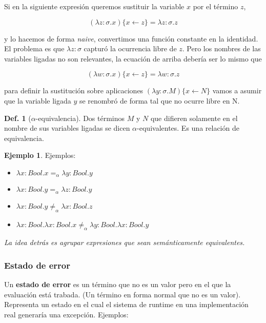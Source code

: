 \documentclass{report}
\theoremstyle{definition} %
\newtheorem{definition}{Def.}[chapter]
\newtheorem*{example*}{Ejemplo}
\newcommand{\aeq}{=_\alpha}
\newcommand{\naeq}{\neq_\alpha}
\newcommand{\abs}[3]{\lambda #1 : #2 . #3}
\newcommand{\sustOne}[3]{#1 \{ #2 \leftarrow #3 \}}
\begin{document}
Si en la siguiente expresión queremos sustituir la variable $x$ por el término
$z$,

\[
    \sustOne{(\abs{z}{\sigma}{x})}{x}{z} = \abs{z}{\sigma}{z}
\]

y lo hacemos de forma \textit{naive}, convertimos una función constante en la
identidad. El problema es que $\lambda z : \sigma$ capturó la ocurrencia libre
de $z$. Pero los nombres de las variables ligadas no son relevantes, la ecuación
de arriba debería ser lo mismo que

\[
    \sustOne{(\abs{w}{\sigma}{x})}{x}{z} = \abs{w}{\sigma}{z}
\]

para definir la sustitución sobre aplicaciones
$\sustOne{(\abs{y}{\sigma}{M})}{x}{N}$ vamos a asumir que la variable ligada $y$
se renombró de forma tal que no ocurre libre en N.

\begin{definition}[$\alpha$-equivalencia]
    Dos términos $M$ y $N$ que difieren solamente en el nombre de sus variables
    ligadas se dicen $\alpha$-equivalentes. Es una relación de equivalencia.
    
    \begin{example*} Ejemplos:
        \begin{itemize}
            \item $\abs{x}{Bool}{x} \aeq \abs{y}{Bool}{y}$
            \item $\abs{x}{Bool}{y} \aeq \abs{z}{Bool}{y}$
            \item $\abs{x}{Bool}{y} \naeq \abs{x}{Bool}{z}$
            \item $\abs{x}{Bool}{\abs{x}{Bool}{x}} \naeq \abs{y}{Bool}{\abs{x}{Bool}{y}}$
        \end{itemize}        
    \end{example*}
\end{definition}

\textit{La idea detrás es agrupar expresiones que sean semánticamente equivalentes.}

\subsubsection{Estado de error}

Un \textbf{estado de error} es un término que no es un valor pero en el que la
evaluación está trabada. (Un término en forma normal que no es un valor).
Representa un estado en el cual el sistema de runtime en una implementación real
generaría una excepción. Ejemplos:
\end{document}
